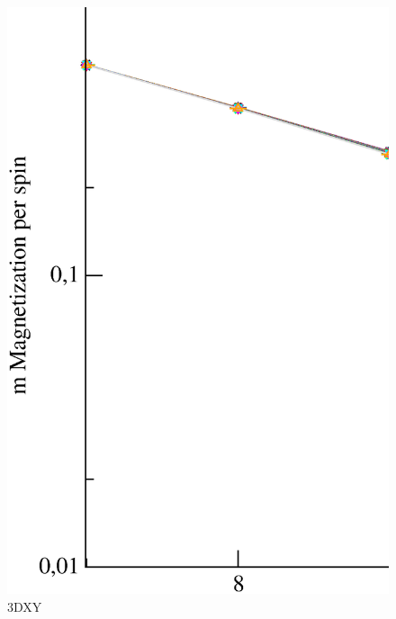 \begin{figure}[!htpb]
  \centering
  \includegraphics[width=15cm]{./plots/3DXY/3DXY_Magnetization_vs_L.eps}
  \caption{3DXY}
\end{figure}

